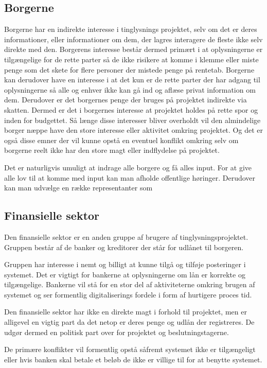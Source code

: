 \documentclass[10pt,a4paper,danish]{article}
\begin{document}
\subsection{Borgerne}
Borgerne har en indirekte interesse i tinglysnings projektet, selv om det er
deres informationer, eller informationer om dem, der lagres interagere de fleste ikke
selv direkte med den. Borgerens interesse består dermed primært i at
oplysningerne er tilgængelige for de rette parter så de ikke risikere at komme i
klemme eller miste penge som det skete for flere personer der mistede penge på
rentetab. Borgerne kan derudover have en interesse i at det kun er de rette
parter der har adgang til oplysningerne så alle og enhver ikke kan gå ind og
aflæse privat information om dem.
Derudover er det borgernes penge der bruges på projektet indirekte via skatten.
Dermed er det i borgernes interesse at projektet holdes på rette spor og inden
for budgettet.
Så længe disse interesser bliver overholdt vil den almindelige borger næppe
have den store interesse eller aktivitet omkring projektet.
Og det er også disse emner der vil kunne opstå en eventuel konflikt omkring selv
om borgerne reelt ikke har den store magt eller indflydelse på projektet.

Det er naturligvis umuligt at indrage alle borgere og få alles input.
For at give alle lov til at komme med input kan man afholde offentlige
høringer. Derudover kan man udvælge en række representanter som

\subsection{Finansielle sektor}

Den finansielle sektor er en anden gruppe af brugere af tinglysningsprojektet.
Gruppen består af de banker og kreditorer der står for udlånet til borgeren.

Gruppen har interesse i nemt og billigt at kunne tilgå og tilføje posteringer i systemet.
Det er vigtigt for bankerne at oplysningerne om lån er korrekte og tilgængelige.
Bankerne vil stå for en stor del af aktiviteterne omkring brugen af systemet og
ser formentlig digitaliserings fordele i form af hurtigere proces tid.

Den finansielle sektor har ikke en direkte magt i forhold til projektet, men er alligevel
en vigtig part da det netop er deres penge og udlån der registreres. De udgør
dermed en politisk part over for projektet og beslutningstagerne.

De primære konflikter vil formentlig opstå såfremt systemet ikke er
tilgængeligt eller hvis banken skal betale et beløb de ikke er villige til for at benytte systemet.
\end{document}
